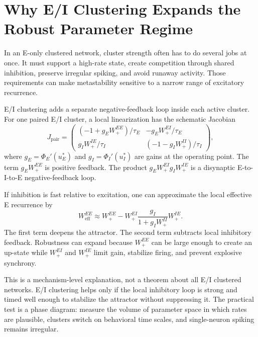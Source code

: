 \section{Why E/I Clustering Expands the Robust Parameter Regime}
\label{sec:ei-clustering-expands-robust-parameter-regime}

In an E-only clustered network, cluster strength often has to do several jobs at once. It must support a high-rate state, create competition through shared inhibition, preserve irregular spiking, and avoid runaway activity. Those requirements can make metastability sensitive to a narrow range of excitatory recurrence.

E/I clustering adds a separate negative-feedback loop inside each active cluster. For one paired E/I cluster, a local linearization has the schematic Jacobian
%
\begin{equation}
  J_{\mathrm{pair}}
  =
  \begin{pmatrix}
    (-1+g_E W_+^{EE})/\tau_E &
    -g_E W_+^{EI}/\tau_E \\[0.6em]
    g_I W_+^{IE}/\tau_I &
    (-1-g_I W_+^{II})/\tau_I
  \end{pmatrix},
  \label{eq:rostami-pair-jacobian}
\end{equation}
%
where $g_E=\Phi_E'(u_E^*)$ and $g_I=\Phi_I'(u_I^*)$ are gains at the operating point. The term $g_E W_+^{EE}$ is positive feedback. The product $g_E W_+^{EI} g_I W_+^{IE}$ is a disynaptic E-to-I-to-E negative-feedback loop.

If inhibition is fast relative to excitation, one can approximate the local effective E recurrence by
%
\begin{equation}
  W_{\mathrm{eff}}^{EE}
  \approx
  W_+^{EE}
  -
  W_+^{EI}
  \frac{g_I}{1+g_I W_+^{II}}
  W_+^{IE}.
  \label{eq:rostami-effective-ee}
\end{equation}
%
The first term deepens the attractor. The second term subtracts local inhibitory feedback. Robustness can expand because $W_+^{EE}$ can be large enough to create an up-state while $W_+^{EI}$ and $W_+^{IE}$ limit gain, stabilize firing, and prevent explosive synchrony.

This is a mechanism-level explanation, not a theorem about all E/I clustered networks. E/I clustering helps only if the local inhibitory loop is strong and timed well enough to stabilize the attractor without suppressing it. The practical test is a phase diagram: measure the volume of parameter space in which rates are plausible, clusters switch on behavioral time scales, and single-neuron spiking remains irregular.

